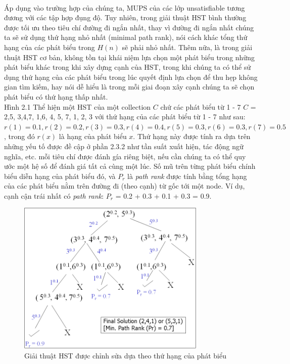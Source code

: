 \\\hspace*{.05\textwidth} Áp dụng vào trường hợp của chúng ta, MUPS của các lớp unsatisfiable tương đương với các tập hợp đụng độ. Tuy nhiên, trong giải thuật HST bình thường được tối ưu theo tiêu chí đường đi ngắn nhất, thay vì đường đi ngắn nhất chúng ta sẽ sử dụng thứ hạng nhỏ nhất (minimal path rank), nói cách khác tổng thứ hạng của các phát biểu trong $H(n)$ sẽ phải nhỏ nhất. Thêm nữa, là trong giải thuật HST cơ bản, không tồn tại khái niệm lựa chọn một phát biểu trong những phát biểu khác trong khi xây dựng cạnh của HST, trong khi chúng ta có thể sử dụng thứ hạng của các phát biểu trong lúc quyết định lựa chọn để thu hẹp không gian tìm kiếm, hay nói dễ hiểu là trong mỗi giai đoạn xây cạnh chúng ta sẽ chọn phát biểu có thứ hạng thấp nhất.
\\\hspace*{.05\textwidth} Hình 2.1 Thể hiện một HST của một collection $C$ chứ các phát biểu từ 1 - 7  $C$ = {{2,5}, {3,4,7}, {1,6}, {4, 5, 7}, {1, 2, 3}} với thứ hạng của các phát biểu từ 1 - 7 như sau: $r(1) = 0.1, r(2) = 0.2, r(3) = 0.3, r(4) = 0.4, r(5) = 0.3, r(6) = 0.3, r(7) = 0.5$, trong đó $r(x)$ là hạng của phát biểu $x$. Thứ hạng này được tính ra dựa trên những yếu tố được đề cập ở phần 2.3.2 như tần suất xuất hiện, tác động ngữ nghĩa, etc. mỗi tiêu chí được đánh gía riêng biệt, nếu cần chúng ta có thể quy ước một hệ số để đánh giá tất cả cùng một lúc. Số mũ trên từng phát biểu chính biểu diễn hạng của phát biểu đó, và $P_{r}$ là \textit{path rank} được tính bằng tổng hạng của các phát biểu nằm trên đường đi (theo cạnh) từ gốc tới một node. Ví dụ, cạnh cận trái nhất có \textit{path rank}: $P_{r}$ = 0.2 + 0.3 + 0.1 + 0.3 = 0.9.
\begin{figure}[ht!]
\centering
\includegraphics[width=90mm]{Figures/fig1.png}
\caption{Giải thuật HST được chỉnh sửa dựa theo thứ hạng của phát biểu \label{overflow}}
\end{figure}
